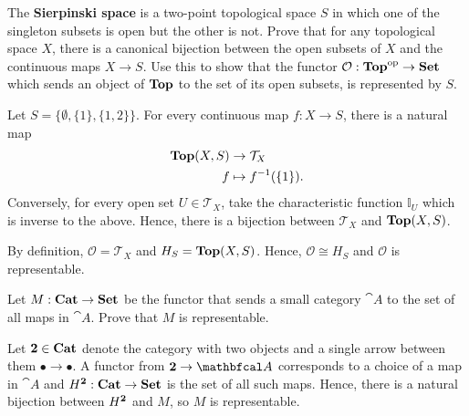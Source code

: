 \documentclass[11pt,a4paper]{article}
\begin{document}
\begin{exercise}
    The \textbf{Sierpinski space} is a two-point topological space $S$ in which one of the singleton subsets is open but the other is not. Prove that for any topological space $X$, there is a canonical bijection between the open subsets of $X$ and the continuous maps $X\to S$. Use this to show that the functor $\mathcal{O}: \mathbf{Top}^\textup{op}\to\mathbf{Set}$ which sends an object of $\mathbf{Top}$ to the set of its open subsets, is represented by $S$.
\end{exercise}
\begin{solution}
    Let $S=\{\emptyset, \{1\}, \{1, 2\}\}$. For every continuous map $f:X\to S$, there is a natural map
    \begin{align*}
        \mathbf{Top}(X,S) &\to \mathcal{T}_X\\
        f &\mapsto f^{-1}(\{1\}).
    \end{align*}
    Conversely, for every open set $U\in\mathcal{T}_X$, take the characteristic function $\mathbb{I}_U$ which is inverse to the above. Hence, there is a bijection between $\mathcal{T}_X$ and $\mathbf{Top}(X,S)$.\par
    By definition, $\mathcal{O}=\mathcal{T}_X$ and $H_S=\mathbf{Top}(X,S)$. Hence, $\mathcal{O}\cong H_S$ and $\mathcal{O}$ is representable.
\end{solution}

\begin{exercise}
    Let $M:\mathbf{Cat}\to\mathbf{Set}$ be the functor that sends a small category $\cat{A}$ to the set of all maps in $\cat{A}$. Prove that $M$ is representable.
\end{exercise}
\begin{solution}
    Let $\mathbf{2}\in\mathbf{Cat}$ denote the category with two objects and a single arrow between them $\bullet\rightarrow\bullet$. A functor from $\bcat{2}\to\cat{A}$ corresponds to a choice of a map in $\cat{A}$ and $H^{\mathbf{2}}:\mathbf{Cat}\to\mathbf{Set}$ is the set of all such maps. Hence, there is a natural bijection between $H^{\mathbf{2}}$ and $M$, so $M$ is representable.
\end{solution}
\end{document}

